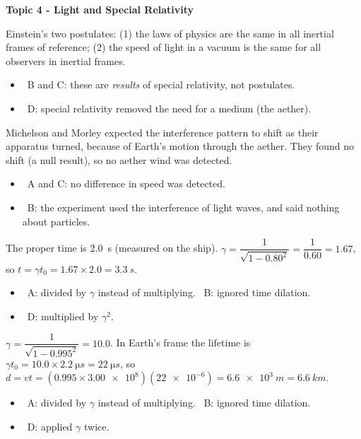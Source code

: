 \documentclass[12pt]{article}
\newcommand\anstopic[1]{\par\Needspace{8\baselineskip}\vspace{4mm}%
  \begin{center}{\headfont\bfseries\fontsize{14}{18}\selectfont #1\par}\end{center}\vspace{2pt}}
\begin{document}
\begin{practiceanswers}
\anstopic{Topic 4 - Light and Special Relativity}

\begin{practiceans}
  Einstein's two postulates: (1) the laws of physics are the same in all inertial frames of reference;
  (2) the speed of light in a vacuum is the same for all observers in inertial frames.
  \begin{itemize}
    \item \xmark\ B and C: these are \emph{results} of special relativity, not postulates.
    \item \xmark\ D: special relativity removed the need for a medium (the aether).
  \end{itemize}
\end{practiceans}

\begin{practiceans}
  Michelson and Morley expected the interference pattern to shift as their apparatus turned, because of
  Earth's motion through the aether. They found no shift (a null result), so no aether wind was
  detected.
  \begin{itemize}
    \item \xmark\ A and C: no difference in speed was detected.
    \item \xmark\ B: the experiment used the interference of light waves, and said nothing about
          particles.
  \end{itemize}
\end{practiceans}

\begin{practiceans}
  The proper time is \qty{2.0}{s} (measured on the ship). $\gamma = \dfrac{1}{\sqrt{1 - 0.80^2}}
  = \dfrac{1}{0.60} = 1.67$, so $t = \gamma t_0 = 1.67 \times 2.0 = \qty{3.3}{s}$.
  \begin{itemize}
    \item \xmark\ A: divided by $\gamma$ instead of multiplying. \quad \xmark\ B: ignored time dilation.
    \item \xmark\ D: multiplied by $\gamma^2$.
  \end{itemize}
\end{practiceans}

\begin{practiceans}
  $\gamma = \dfrac{1}{\sqrt{1 - 0.995^2}} = 10.0$. In Earth's frame the lifetime is
  $\gamma t_0 = 10.0 \times \qty{2.2}{\micro s} = \qty{22}{\micro s}$, so
  $d = vt = (0.995 \times \num{3.00e8})(\num{22e-6}) = \qty{6.6e3}{m} = \qty{6.6}{km}$.
  \begin{itemize}
    \item \xmark\ A: divided by $\gamma$ instead of multiplying. \quad \xmark\ B: ignored time dilation.
    \item \xmark\ D: applied $\gamma$ twice.
  \end{itemize}
\end{practiceans}


\end{practiceanswers}
\end{document}
